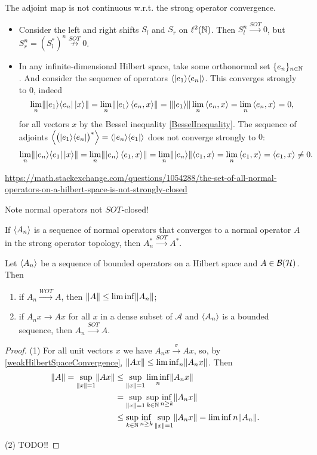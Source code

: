 \begin{example}
The adjoint map is not continuous w.r.t. the strong operator convergence.
\begin{itemize}
\item Consider the left and right shifts $S_l$ and $S_r$ on $\ell^2(\mathbb{N})$. Then $S_l^n \overset{SOT}{\longrightarrow} 0$, but $S_r^n = (S_l^*)^n \overset{SOT}{\not\longrightarrow} 0$.
\item In any infinite-dimensional Hilbert space, take some orthonormal set $\{e_n\}_{n\in \mathbb{N}}$. And consider the sequence of operators $\left\langle |e_1\rangle\langle e_n| \right\rangle$. This converges strongly to $0$, indeed
\[ \lim_n\norm{\ketbra{e_1}{e_n}\ket{x}} = \lim_n\norm{\ket{e_1}\inner{e_n, x}} = \norm{\ket{e_1}}\lim_n\inner{e_n, x} = \lim_n\inner{e_n, x} = 0, \]
for all vectors $x$ by the Bessel inequality \ref{BesselInequality}. The sequence of adjoints $\left\langle \big(|e_1\rangle\langle e_n|\big)^* \right\rangle = \left\langle |e_n\rangle\langle e_1| \right\rangle$ does not converge strongly to $0$:
\[ \lim_n\norm{\ketbra{e_n}{e_1}\ket{x}} = \lim_n\norm{\ket{e_n}\inner{e_1, x}} = \lim_n\norm{\ket{e_n}}\inner{e_1, x} = \lim_n\inner{e_1, x} = \inner{e_1, x} \neq 0. \]
\end{itemize}
\end{example}

\url{https://math.stackexchange.com/questions/1054288/the-set-of-all-normal-operators-on-a-hilbert-space-is-not-strongly-closed}


Note normal operators not $SOT$-closed!
\begin{proposition}
If $\left\langle A_n \right\rangle$ is a sequence of normal operators that converges to a normal operator $A$ in the strong operator topology, then $A_n^* \overset{SOT}{\longrightarrow} A^*$.
\end{proposition}

\begin{proposition}
Let $\left\langle A_n \right\rangle$ be a sequence of bounded operators on a Hilbert space and $A\in\operatorname{\mathcal{B}}(\mathcal{H})$. Then
\begin{enumerate}
\item if $A_n \overset{WOT}{\longrightarrow} A$, then $\lVert A\rVert\leq \liminf\lVert A_n\rVert$;
\item if $A_nx \longrightarrow Ax$ for all $x$ in a dense subset of $\mathcal{A}$ and $\left\langle A_n \right\rangle$ is a bounded sequence, then $A_n \overset{SOT}{\longrightarrow} A$.
\end{enumerate}
\end{proposition}
\begin{proof}
(1) For all unit vectors $x$ we have $A_nx \overset{\sigma}{\longrightarrow} Ax$, so, by \ref{weakHilbertSpaceConvergence}, $\lVert Ax\rVert \leq \liminf_n\lVert A_nx\rVert$. Then
\begin{align*}
\lVert A\rVert = \sup_{\lVert x\rVert=1}\lVert Ax\rVert &\leq \sup_{\lVert x\rVert=1}\liminf_n\lVert A_nx\rVert \\
&= \sup_{\lVert x\rVert=1}\sup_{k\in \mathbb{N}}\inf_{n\geq k}\lVert A_nx\rVert \\
&\leq \sup_{k\in \mathbb{N}}\inf_{n\geq k}\sup_{\lVert x\rVert=1}\lVert A_nx\rVert = \liminf{n}\lVert A_n\rVert.
\end{align*}

(2) TODO!!
\end{proof}


